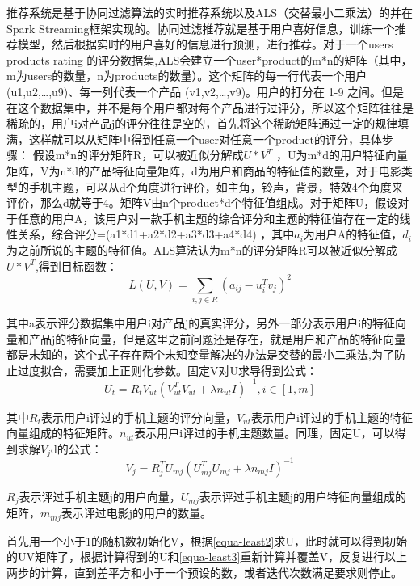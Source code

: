     推荐系统是基于协同过滤算法的实时推荐系统以及ALS（交替最小二乘法）的并在Spark Streaming框架实现的。协同过滤推荐就是基于用户喜好信息，训练一个推荐模型，然后根据实时的用户喜好的信息进行预测，进行推荐。对于一个users products rating 的评分数据集,ALS会建立一个user*product的m*n的矩阵（其中，m为users的数量，n为products的数量）。这个矩阵的每一行代表一个用户 (u1,u2,…,u9)、每一列代表一个产品 (v1,v2,…,v9)。用户的打分在 1-9 之间。但是在这个数据集中，并不是每个用户都对每个产品进行过评分，所以这个矩阵往往是稀疏的，用户i对产品j的评分往往是空的，首先将这个稀疏矩阵通过一定的规律填满，这样就可以从矩阵中得到任意一个user对任意一个product的评分，具体步骤：
    假设m*n的评分矩阵R，可以被近似分解成$U*V^{T}$ ，U为m*d的用户特征向量矩阵，V为n*d的产品特征向量矩阵，d为用户和商品的特征值的数量，对于电影类型的手机主题，可以从d个角度进行评价，如主角，铃声，背景，特效4个角度来评价，那么d就等于4。矩阵V由n个product*d个特征值组成。对于矩阵U，假设对于任意的用户A，该用户对一款手机主题的综合评分和主题的特征值存在一定的线性关系，综合评分=(a1*d1+a2*d2+a3*d3+a4*d4) ，其中$a_{i}$为用户A的特征值，$d_{i}$为之前所说的主题的特征值。ALS算法认为m*n的评分矩阵R可以被近似分解成$U*V^{T}$,得到目标函数：
    \begin{equation}
    L(U,V)=\sum_{i,j \in R}(a_{ij}-u_{i}^{T}v_{j})^{2}
    \label{F-Measure}
    \end{equation}

    其中a表示评分数据集中用户i对产品j的真实评分，另外一部分表示用户i的特征向量和产品j的特征向量，但是这里之前问题还是存在，就是用户和产品的特征向量都是未知的，这个式子存在两个未知变量解决的办法是交替的最小二乘法,为了防止过度拟合，需要加上正则化参数。固定V对U求导得到公式：
    \begin{equation}
    U_{t}=R_{t}V_{ut}(V_{ut}^TV_{ut}+\lambda n_{ut}I)^{-1}, i \in [1,m]
    \label{equa-least2}
    \end{equation}

    其中$R_{t}$表示用户i评过的手机主题的评分向量，$V_{ut}$表示用户i评过的手机主题的特征向量组成的特征矩阵。$n_{ut}$表示用户i评过的手机主题数量。同理，固定U，可以得到求解$V_{j}$d的公式：
    \begin{equation}
    V_{j}=R_{j}^{T}U_{mj}(U_{mj}^{T}U_{mj}+\lambda n_{mj}I)^{-1}
    \label{equa-least3}
    \end{equation}

    $R_{j}$表示评过手机主题j的用户向量，$U_{mj}$表示评过手机主题j的用户特征向量组成的矩阵，$m_{mj}$表示评过电影j的用户的数量。

    首先用一个小于1的随机数初始化V，根据\autoref{equa-least2}求U，此时就可以得到初始的UV矩阵了，根据计算得到的U和\autoref{equa-least3}重新计算并覆盖V，反复进行以上两步的计算，直到差平方和小于一个预设的数，或者迭代次数满足要求则停止。

